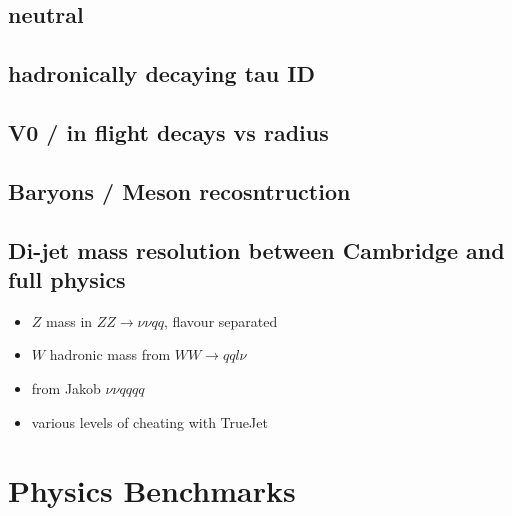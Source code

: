 \subsection{neutral}
\subsection{hadronically decaying tau ID}
\subsection{V0 / in flight decays vs radius}
\subsection{Baryons / Meson recosntruction}
\subsection{Di-jet mass resolution between Cambridge and full physics}
\begin{itemize}
\item $Z$ mass in $ZZ \to \nu\nu qq$, flavour separated
\item $W$ hadronic mass from $WW \to qq l\nu$
\item from Jakob $\nu\nu qqqq$
\item various levels of cheating with TrueJet
\end{itemize}


\section{Physics Benchmarks}
